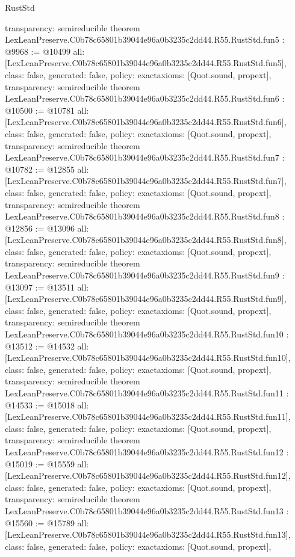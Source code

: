 \begin{lexlean}{RustStd}
\begin{coremodule}
{  transparency: semireducible
}
theorem LexLeanPreserve.C0b78c65801b39044e96a0b3235c2dd44.R55.RustStd.fun5 : @9968 := @10499 {
  all: [LexLeanPreserve.C0b78c65801b39044e96a0b3235c2dd44.R55.RustStd.fun5],
  class: false,
  generated: false,
  policy: exact{axioms: [Quot.sound, propext]},
  transparency: semireducible
}
theorem LexLeanPreserve.C0b78c65801b39044e96a0b3235c2dd44.R55.RustStd.fun6 : @10500 := @10781 {
  all: [LexLeanPreserve.C0b78c65801b39044e96a0b3235c2dd44.R55.RustStd.fun6],
  class: false,
  generated: false,
  policy: exact{axioms: [Quot.sound, propext]},
  transparency: semireducible
}
theorem LexLeanPreserve.C0b78c65801b39044e96a0b3235c2dd44.R55.RustStd.fun7 : @10782 := @12855 {
  all: [LexLeanPreserve.C0b78c65801b39044e96a0b3235c2dd44.R55.RustStd.fun7],
  class: false,
  generated: false,
  policy: exact{axioms: [Quot.sound, propext]},
  transparency: semireducible
}
theorem LexLeanPreserve.C0b78c65801b39044e96a0b3235c2dd44.R55.RustStd.fun8 : @12856 := @13096 {
  all: [LexLeanPreserve.C0b78c65801b39044e96a0b3235c2dd44.R55.RustStd.fun8],
  class: false,
  generated: false,
  policy: exact{axioms: [Quot.sound, propext]},
  transparency: semireducible
}
theorem LexLeanPreserve.C0b78c65801b39044e96a0b3235c2dd44.R55.RustStd.fun9 : @13097 := @13511 {
  all: [LexLeanPreserve.C0b78c65801b39044e96a0b3235c2dd44.R55.RustStd.fun9],
  class: false,
  generated: false,
  policy: exact{axioms: [Quot.sound, propext]},
  transparency: semireducible
}
theorem LexLeanPreserve.C0b78c65801b39044e96a0b3235c2dd44.R55.RustStd.fun10 : @13512 := @14532 {
  all: [LexLeanPreserve.C0b78c65801b39044e96a0b3235c2dd44.R55.RustStd.fun10],
  class: false,
  generated: false,
  policy: exact{axioms: [Quot.sound, propext]},
  transparency: semireducible
}
theorem LexLeanPreserve.C0b78c65801b39044e96a0b3235c2dd44.R55.RustStd.fun11 : @14533 := @15018 {
  all: [LexLeanPreserve.C0b78c65801b39044e96a0b3235c2dd44.R55.RustStd.fun11],
  class: false,
  generated: false,
  policy: exact{axioms: [Quot.sound, propext]},
  transparency: semireducible
}
theorem LexLeanPreserve.C0b78c65801b39044e96a0b3235c2dd44.R55.RustStd.fun12 : @15019 := @15559 {
  all: [LexLeanPreserve.C0b78c65801b39044e96a0b3235c2dd44.R55.RustStd.fun12],
  class: false,
  generated: false,
  policy: exact{axioms: [Quot.sound, propext]},
  transparency: semireducible
}
theorem LexLeanPreserve.C0b78c65801b39044e96a0b3235c2dd44.R55.RustStd.fun13 : @15560 := @15789 {
  all: [LexLeanPreserve.C0b78c65801b39044e96a0b3235c2dd44.R55.RustStd.fun13],
  class: false,
  generated: false,
  policy: exact{axioms: [Quot.sound, propext]},
}
\end{coremodule}
\end{lexlean}
